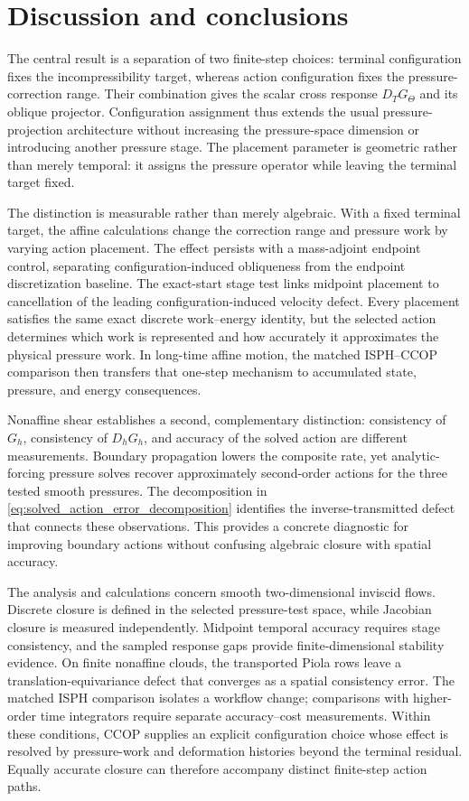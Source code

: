 \documentclass[11pt]{article}
\theoremstyle{plain}
\theoremstyle{definition}
\theoremstyle{remark}
\begin{document}
\section{Discussion and conclusions}
\label{sec:discussion_conclusion}

The central result is a separation of two finite-step choices: terminal
configuration fixes the incompressibility target, whereas action configuration
fixes the pressure-correction range.  Their combination gives the scalar cross
response $D_TG_\Theta$ and its oblique projector.  Configuration assignment thus
extends the usual pressure-projection architecture without increasing the
pressure-space dimension or introducing another pressure stage.  The placement
parameter is geometric rather than merely temporal: it assigns the pressure
operator while leaving the terminal target fixed.

The distinction is measurable rather than merely algebraic.  With a fixed
terminal target, the affine calculations change the correction range and
pressure work by varying action placement.  The effect persists with a
mass-adjoint endpoint control, separating configuration-induced obliqueness
from the endpoint discretization baseline.  The exact-start stage test links
midpoint placement to cancellation of the leading configuration-induced
velocity defect.  Every placement satisfies the same exact discrete
work--energy identity, but the selected action determines which work is
represented and how accurately it approximates the physical pressure work.  In long-time
affine motion, the matched ISPH--CCOP comparison then transfers that one-step
mechanism to accumulated state, pressure, and energy consequences.

Nonaffine shear establishes a second, complementary distinction: consistency
of $G_h$, consistency of $D_hG_h$, and accuracy of the solved action are
different measurements.  Boundary propagation lowers the composite rate,
yet analytic-forcing pressure solves recover approximately second-order
actions for the three tested smooth pressures.  The decomposition in
\eqref{eq:solved_action_error_decomposition} identifies the inverse-transmitted
defect that connects these observations.  This provides a concrete diagnostic
for improving boundary actions without confusing algebraic closure with
spatial accuracy.

The analysis and calculations concern smooth two-dimensional inviscid flows.
Discrete closure is defined in the selected pressure-test space, while
Jacobian closure is measured independently.  Midpoint temporal accuracy
requires stage consistency, and the sampled response gaps provide
finite-dimensional stability evidence.  On finite nonaffine clouds, the
transported Piola rows leave a translation-equivariance defect that converges
as a spatial consistency error.
The matched ISPH comparison isolates a workflow change; comparisons with
higher-order time integrators require separate accuracy--cost measurements.
Within these conditions, CCOP supplies an explicit configuration choice whose
effect is resolved by pressure-work and deformation histories beyond the
terminal residual.  Equally accurate closure can therefore accompany distinct
finite-step action paths.
\end{document}
